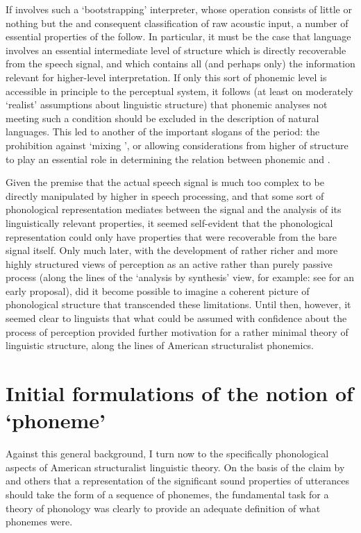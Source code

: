 If  involves such a `bootstrapping' interpreter,
whose operation consists of little or nothing but the  and
consequent classification of raw acoustic input, a number of essential
properties of the  follow. In particular, it must be
the case that language involves an essential intermediate level of
structure which is directly recoverable from the speech signal, and
which contains all (and perhaps only) the information relevant for
higher-level interpretation. If only this sort of phonemic level is
accessible in principle to the perceptual system, it follows (at least
on moderately `realist' assumptions about linguistic structure) that
phonemic analyses not meeting such a condition should be excluded in
the description of natural languages. This led to another of the
important slogans of the period: the prohibition against `mixing
', or allowing considerations from higher  of structure to
play an essential role in determining the relation between phonemic
and .

Given the premise that the actual speech signal is much too complex to
be directly manipulated by higher  in speech processing, and
that some sort of phonological representation mediates between the
signal and the analysis of its linguistically relevant properties, it
seemed self-evident that the phonological representation could only
have properties that were recoverable from the bare signal
itself. Only much later, with the development of rather richer and
more highly structured views of perception as an active rather than
purely passive process (along the lines of the `analysis by synthesis'
view, for example: see \citealt{halle.stevens62:analysis.by.synthesis}
for an early proposal), did it become possible to imagine a coherent
picture of phonological structure that transcended these
limitations. Until then, however, it seemed clear to linguists that
what could be assumed with confidence about the process of perception
provided further motivation for a rather minimal theory of linguistic
structure, along the lines of American structuralist phonemics.

\section{Initial formulations of the notion of `phoneme'}

Against this general background, I turn now to the specifically
phonological aspects of American structuralist linguistic theory. On
the basis of the claim by {\Bloomfield} and others that a representation
of the significant sound properties of utterances should take the form
of a sequence of phonemes, the fundamental task for a theory of
phonology was clearly to provide an adequate definition of what
phonemes were.

